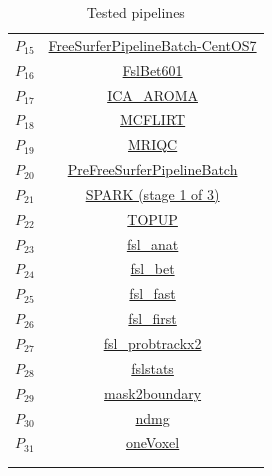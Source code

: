 \begin{table}
\begin{tabular}{cc}
        $P_{15}$ & \href{https://doi.org/10.5281/zenodo.1450997}{FreeSurferPipelineBatch-CentOS7}\\
        $P_{16}$ & \href{https://doi.org/10.5281/zenodo.3267250}{FslBet601}	\\
        $P_{17}$ & \href{https://doi.org/10.5281/zenodo.1445789}{ICA\_AROMA}	\\
        $P_{18}$ & \href{https://doi.org/10.5281/zenodo.2602109}{MCFLIRT}	\\
        $P_{19}$ & \href{https://doi.org/10.5281/zenodo.3242714}{MRIQC}	\\
        $P_{20}$ & \href{https://doi.org/10.5281/zenodo.1450995}{PreFreeSurferPipelineBatch}	\\
        $P_{21}$ & \href{https://doi.org/10.5281/zenodo.4010734}{SPARK (stage 1 of 3)}	\\
        $P_{22}$ & \href{https://doi.org/10.5281/zenodo.2621482}{TOPUP}	\\
        $P_{23}$ & \href{https://doi.org/10.5281/zenodo.3899496}{fsl\_anat}	\\
        $P_{24}$ & \href{https://doi.org/10.5281/zenodo.1482743}{fsl\_bet}	\\
        $P_{25}$ & \href{https://doi.org/10.5281/zenodo.1494308}{fsl\_fast}	\\
        $P_{26}$ & \href{https://doi.org/10.5281/zenodo.1494312}{fsl\_first}	\\
        $P_{27}$ & \href{target: https://doi.org/10.5281/zenodo.1450991}{fsl\_probtrackx2}	\\
        $P_{28}$ & \href{https://doi.org/10.5281/zenodo.4472771}{fslstats}	\\
        $P_{29}$ & \href{https://doi.org/10.5281/zenodo.2566443}{mask2boundary}\\
        $P_{30}$ & \href{https://doi.org/10.5281/zenodo.1450999}{ndmg}	\\
        $P_{31}$ & \href{https://doi.org/10.5281/zenodo.3308620}{oneVoxel}\\
        \hline\\
        &
    \end{tabular}
    \caption{Tested pipelines}
    \label{tab:pipeline_names}
\end{table}



